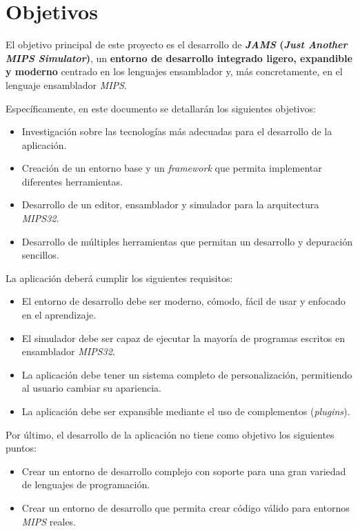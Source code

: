 \section{Objetivos}\label{sec:objetivos}

El objetivo principal de este proyecto es el desarrollo de \textbf{\textit{JAMS}
(\textit{Just Another MIPS Simulator})}, un \textbf{entorno de desarrollo integrado ligero, expandible y moderno}
centrado en los lenguajes ensamblador y, más concretamente, en el lenguaje ensamblador \textit{MIPS}.

\noindent Específicamente, en este documento se detallarán los siguientes objetivos:
\begin{itemize}
    \item Investigación sobre las tecnologías más adecuadas para el desarrollo de la aplicación.
    \item Creación de un entorno base y un \textit{framework} que permita implementar diferentes herramientas.
    \item Desarrollo de un editor, ensamblador y simulador para la arquitectura \textit{MIPS32}.
    \item Desarrollo de múltiples herramientas que permitan un desarrollo y depuración sencillos.
\end{itemize}

\noindent La aplicación deberá cumplir los siguientes requisitos:
\begin{itemize}
    \item El entorno de desarrollo debe ser moderno, cómodo, fácil de usar y enfocado en el aprendizaje.
    \item El simulador debe ser capaz de ejecutar la mayoría de programas escritos en ensamblador \textit{MIPS32}.
    \item La aplicación debe tener un sistema completo de personalización, permitiendo al usuario cambiar su apariencia.
    \item La aplicación debe ser expansible mediante el uso de complementos (\textit{plugins}).
\end{itemize}

\noindent Por último, el desarrollo de la aplicación no tiene como objetivo los siguientes puntos:
\begin{itemize}
    \item Crear un entorno de desarrollo complejo con soporte para una gran variedad de lenguajes de programación.
    \item Crear un entorno de desarrollo que permita crear código válido para entornos \textit{MIPS} reales.
\end{itemize}

